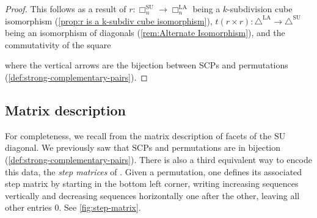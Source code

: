 \documentclass{amsart}
\newcommand{\darkblue}{\color{darkblue}} %
\theoremstyle{definition}
\newcommand{\defn}[1]{\textsl{\darkblue #1}} %
\newcommand{\SU}{\mathrm{SU}}
\newcommand{\LA}{\mathrm{LA}}
\newcommand{\SUD}{\triangle^{\mathrm{SU}}}
\newcommand{\LAD}{\triangle^{\mathrm{LA}}}
\newcommand{\SCP}{\mathrm{SCP}}
\newcommand{\divcube}[1]{\Box_{#1}}
\begin{document}
\begin{proof}
This follows as a result of $r:\divcube{n}^{\SU}\to \divcube{n}^{\LA}$ being a $k$-subdivision cube isomorphism (\cref{prop:r is a k-subdiv cube isomorphism}), $t(r\times r):\LAD\to \SUD$ being an isomorphism of diagonals (\cref{rem:Alternate Isomorphism}), and the commutativity of the square 
\begin{center}
\end{center}
where the vertical arrows are the bijection between SCPs and permutations (\cref{def:strong-complementary-pairs}).
\end{proof}




\subsection{Matrix description}
\label{subsec:matrix}

For completeness, we recall from \cite{SaneblidzeUmble} the matrix description of facets of the $\SU$ diagonal.
We previously saw that $\SCP$s and permutations are in bijection (\cref{def:strong-complementary-pairs}). 
There is also a third equivalent way to encode this data, the \defn{step matrices} of \cite[Def. 6]{SaneblidzeUmble}.
Given a permutation, one defines its associated step matrix by starting in the bottom left corner, writing increasing sequences vertically and decreasing sequences horizontally one after the other, leaving all other entries $0$.
See \cref{fig:step-matrix}.
\end{document}
